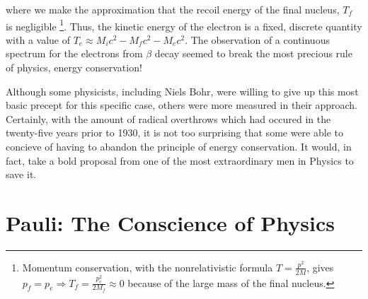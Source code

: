 \documentclass[12pt]{book}
\begin{document}
where we make the approximation that the recoil energy of the final nucleus, $T_{f}$ is negligible \footnote{Momentum conservation, with the nonrelativistic formula $T=\frac{p^{2}}{2M}$, gives $p_{f}=p_{e} \Rightarrow T_{f}=\frac{p_{e}^{2}}{2M_{f}}\approx0$ because of the large mass of the final nucleus.}. Thus, the kinetic energy of the electron is a fixed, discrete quantity with a value of $T_{e}\approx M_{i}c^{2}-M_{f}c^{2}-M_{e}c^{2}$. The observation of a continuous spectrum for the electrons from $\beta$ decay seemed to break the most precious rule of physics, energy conservation!

Although some physicists, including Niels Bohr, were willing to give up this most basic precept for this specific case, others were more measured in their approach. Certainly, with the amount of radical overthrows which had occured in the twenty-five years prior to 1930, it is not too surprising that some were able to concieve of having to abandon the principle of energy conservation. It would, in fact, take a bold proposal from one of the most extraordinary men in Physics to save it.

\section{Pauli: The Conscience of Physics}
\end{document}
